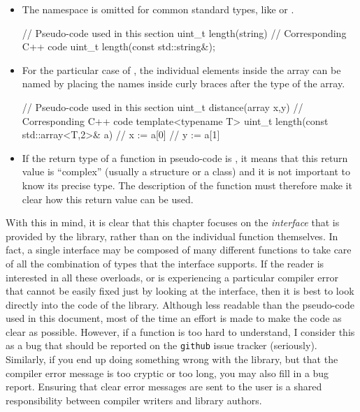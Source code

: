 \documentclass[12pt]{report}
\newenvironment{example}
{
    \begin{mdframed}[style=example,frametitle={Example}]
}
{
    \end{mdframed}
}
\begin{document}
\begin{itemize}
\item The  namespace is omitted for common standard types, like  or .

\begin{example}
\begin{cppcode}
// Pseudo-code used in this section
uint_t length(string)
// Corresponding C++ code
uint_t length(const std::string&);
\end{cppcode}
\end{example}

\item For the particular case of , the individual elements inside the array can be named by placing the names inside curly braces after the type of the array.

\begin{example}
\begin{cppcode}
// Pseudo-code used in this section
uint_t distance(array {x,y})
// Corresponding C++ code
template<typename T>
uint_t length(const std::array<T,2>& a) {
    // x := a[0]
    // y := a[1]
}
\end{cppcode}
\end{example}

\item If the return type of a function in pseudo-code is , it means that this return value is ``complex'' (usually a structure or a class) and it is not important to know its precise type. The description of the function must therefore make it clear how this return value can be used.

\end{itemize}

With this in mind, it is clear that this chapter focuses on the \emph{interface} that is provided by the library, rather than on the individual function themselves. In fact, a single interface may be composed of many different functions to take care of all the combination of types that the interface supports. If the reader is interested in all these overloads, or is experiencing a particular compiler error that cannot be easily fixed just by looking at the interface, then it is best to look directly into the code of the library. Although less readable than the pseudo-code used in this document, most of the time an effort is made to make the code as clear as possible. However, if a function is too hard to understand, I consider this as a bug that should be reported on the \texttt{github} issue tracker (seriously). Similarly, if you end up doing something wrong with the library, but that the compiler error message is too cryptic or too long, you may also fill in a bug report. Ensuring that clear error messages are sent to the user is a shared responsibility between compiler writers and library authors.
\end{document}
